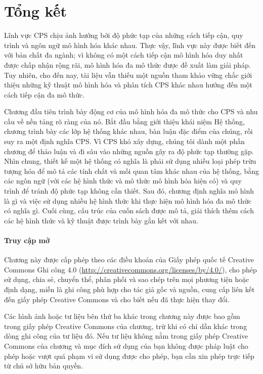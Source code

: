 \section{Tổng kết}
Lĩnh vực CPS chịu ảnh hưởng bởi độ phức tạp của những cách tiếp cận, quy trình và ngôn ngữ mô hình hóa khác nhau. Thực vậy, lĩnh vực này được biết đến với bản chất đa ngành; vì không có một cách tiếp cận mô hình hóa duy nhất được chấp nhận rộng rãi, mô hình hóa đa mô thức được đề xuất làm giải pháp. Tuy nhiên, cho đến nay, tài liệu vẫn thiếu một nguồn tham khảo vững chắc giới thiệu những kỹ thuật mô hình hóa và phân tích CPS khác nhau hướng đến một cách tiếp cận đa mô thức.

Chương đầu tiên trình bày động cơ của mô hình hóa đa mô thức cho CPS và nhu cầu về nền tảng rõ ràng của nó. Bắt đầu bằng giới thiệu khái niệm Hệ thống, chương trình bày các lớp hệ thống khác nhau, bàn luận đặc điểm của chúng, rồi suy ra một định nghĩa CPS. Vì CPS khó xây dựng, chúng tôi dành một phần chương để thảo luận và đi sâu vào những nguồn gây ra độ phức tạp thường gặp. Nhìn chung, thiết kế một hệ thống có nghĩa là phải sử dụng nhiều loại phép trừu tượng hóa để mô tả các tính chất và mối quan tâm khác nhau của hệ thống, bằng các ngôn ngữ (với các hệ hình thức và mô thức mô hình hóa hiện có) và quy trình để tránh độ phức tạp không cần thiết. Sau đó, chương định nghĩa mô hình là gì và việc sử dụng nhiều hệ hình thức khi thực hiện mô hình hóa đa mô thức có nghĩa gì. Cuối cùng, cấu trúc của cuốn sách được mô tả, giải thích thêm cách các hệ hình thức và kỹ thuật được trình bày gắn kết với nhau.

\paragraph*{Truy cập mở}
Chương này được cấp phép theo các điều khoản của Giấy phép quốc tế Creative Commons Ghi công 4.0 (\url{http://creativecommons.org/licenses/by/4.0/}), cho phép sử dụng, chia sẻ, chuyển thể, phân phối và sao chép trên mọi phương tiện hoặc định dạng, miễn là ghi công phù hợp cho tác giả gốc và nguồn, cung cấp liên kết đến giấy phép Creative Commons và cho biết nếu đã thực hiện thay đổi.

Các hình ảnh hoặc tư liệu bên thứ ba khác trong chương này được bao gồm trong giấy phép Creative Commons của chương, trừ khi có chỉ dẫn khác trong dòng ghi công của tư liệu đó. Nếu tư liệu không nằm trong giấy phép Creative Commons của chương và mục đích sử dụng của bạn không được pháp luật cho phép hoặc vượt quá phạm vi sử dụng được cho phép, bạn cần xin phép trực tiếp từ chủ sở hữu bản quyền.
